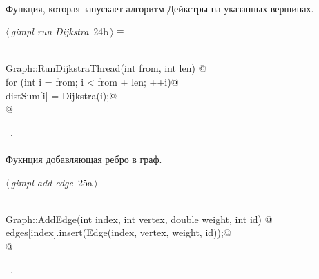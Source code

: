 \documentclass[12pt]{article}
\begin{document}
\paragraph{}
Функция, которая запускает алгоритм Дейкстры на указанных вершинах.
\begin{flushleft} \small
\begin{minipage}{\linewidth}\label{scrap38}\raggedright\small
{} $\langle\,${\itshape gimpl run Dijkstra}\nobreak\ {\footnotesize {24b}}$\,\rangle\equiv$
\vspace{-1ex}
\begin{list}{}{} \item
\mbox{}\verb@@\\
\mbox{}\verb@void Graph::RunDijkstraThread(int from, int len) {@\\
\mbox{}\verb@    for (int i = from; i < from + len; ++i)@\\
\mbox{}\verb@        distSum[i] = Dijkstra(i);@\\
\mbox{}\verb@}@\\
\mbox{}\verb@@{\NWsep}
\end{list}
\vspace{-1.5ex}
\footnotesize
\begin{list}{}{\setlength{\itemsep}{-\parsep}\setlength{\itemindent}{-\leftmargin}}
\item \NWtxtMacroRefIn\ .

\item{}
\end{list}
\end{minipage}\vspace{4ex}
\end{flushleft}
\paragraph{}
Фукнция добавляющая ребро в граф.
\begin{flushleft} \small
\begin{minipage}{\linewidth}\label{scrap39}\raggedright\small
{} $\langle\,${\itshape gimpl add edge}\nobreak\ {\footnotesize {25a}}$\,\rangle\equiv$
\vspace{-1ex}
\begin{list}{}{} \item
\mbox{}\verb@@\\
\mbox{}\verb@void Graph::AddEdge(int index, int vertex, double weight, int id) {@\\
\mbox{}\verb@    edges[index].insert(Edge(index, vertex, weight, id));@\\
\mbox{}\verb@}@\\
\mbox{}\verb@@{\NWsep}
\end{list}
\vspace{-1.5ex}
\footnotesize
\begin{list}{}{\setlength{\itemsep}{-\parsep}\setlength{\itemindent}{-\leftmargin}}
\item \NWtxtMacroRefIn\ .

\item{}
\end{list}
\end{minipage}\vspace{4ex}
\end{flushleft}
\end{document}
